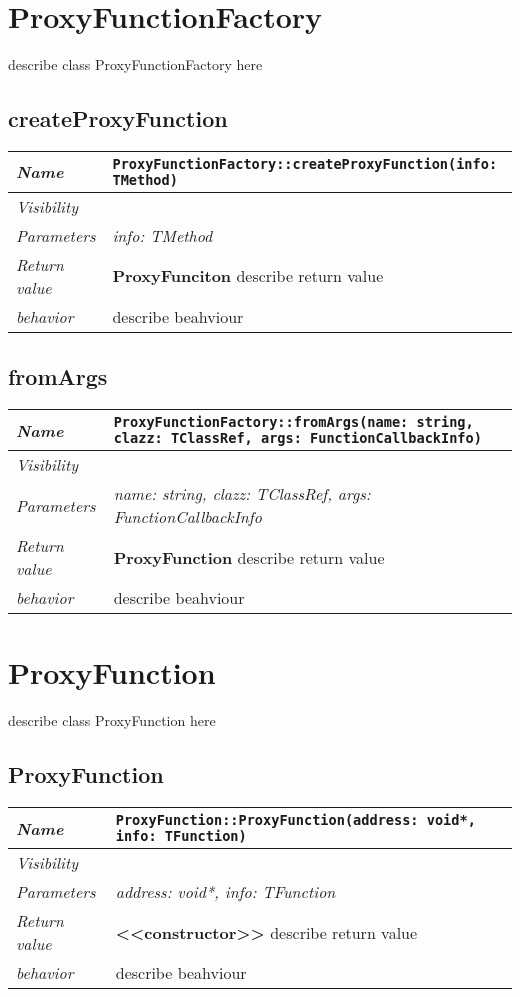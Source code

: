  \chapter{ProxyFunctionFactory}
describe class ProxyFunctionFactory here
\section{createProxyFunction}
\begin{longtable}{p{3cm} @{\hskip 1cm} p{12cm}}
 \hline
\textit{Name} & \texttt{ProxyFunctionFactory::createProxyFunction(info: TMethod)}\\
\hline
 \textit{Visibility} & \\
\hline
\textit{Parameters} & \textit{info: TMethod}\\
\hline
\textit{Return value} & \textbf{ ProxyFunciton} describe return value\\
  \hline
 \textit{behavior} & describe beahviour \\
\hline
\end{longtable} \pagebreak
 \section{fromArgs}
\begin{longtable}{p{3cm} @{\hskip 1cm} p{12cm}}
 \hline
\textit{Name} & \texttt{ProxyFunctionFactory::fromArgs(name: string, clazz: TClassRef, args: FunctionCallbackInfo)}\\
\hline
 \textit{Visibility} & \\
\hline
\textit{Parameters} & \textit{name: string, clazz: TClassRef, args: FunctionCallbackInfo}\\
\hline
\textit{Return value} & \textbf{ ProxyFunction} describe return value\\
  \hline
 \textit{behavior} & describe beahviour \\
\hline
\end{longtable} \pagebreak
 \chapter{ProxyFunction}
describe class ProxyFunction here
\section{ProxyFunction}
\begin{longtable}{p{3cm} @{\hskip 1cm} p{12cm}}
 \hline
\textit{Name} & \texttt{ProxyFunction::ProxyFunction(address: void*, info: TFunction)}\\
\hline
 \textit{Visibility} & \\
\hline
\textit{Parameters} & \textit{address: void*, info: TFunction}\\
\hline
\textit{Return value} & \textbf{ <<constructor>>} describe return value\\
  \hline
 \textit{behavior} & describe beahviour \\
\hline
\end{longtable} \pagebreak
